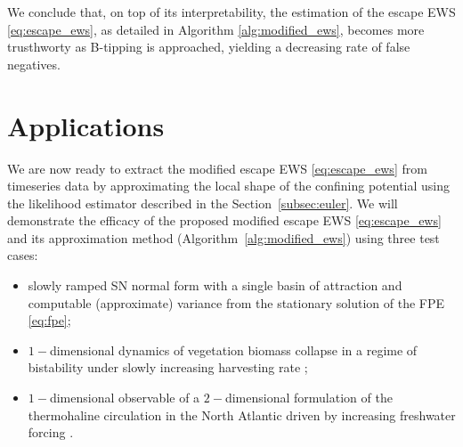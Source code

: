 \documentclass[a4paper,fleqn]{cas-sc}
\newcommand{\sref}[1]{Section~\ref{#1}}
\begin{document}
We conclude that, on top of its interpretability, the estimation of the escape EWS \eqref{eq:escape_ews}, as detailed in Algorithm \ref{alg:modified_ews}, becomes more trusthworty as B-tipping is approached, yielding a decreasing rate of false negatives.

\section{Applications}\label{sec:applications}
We are now ready to extract the modified escape EWS \eqref{eq:escape_ews} from timeseries data by approximating the local shape of the confining potential using the likelihood estimator described in the \sref{subsec:euler}.
We will demonstrate the efficacy of the proposed modified escape EWS \eqref{eq:escape_ews} and its approximation method (Algorithm~\ref{alg:modified_ews}) using three test cases:
%
\begin{itemize}
     \item slowly ramped SN normal form with a single basin of attraction and computable (approximate) variance from the stationary solution of the FPE \eqref{eq:fpe};
     \item $1-$dimensional dynamics of vegetation biomass collapse in a regime of bistability under slowly increasing harvesting rate \cite{May1977};
     \item $1-$dimensional observable of a $2-$dimensional formulation of the thermohaline circulation in the North Atlantic driven by increasing freshwater forcing \cite{Stommel1961}.
\end{itemize}
%
\end{document}
